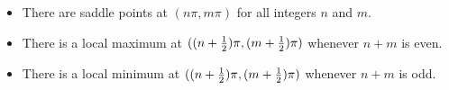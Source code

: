 \documentclass[9pt]{beamer}
\begin{document}
\begin{frame}[t]
{ }
 \fi
 \begin{itemize}
  \item<2-> There are saddle points at $(n\pi,m\pi)$ for all integers $n$ and $m$.
  \item<3-> There is a local maximum at $((n+\tfrac{1}{2})\pi,(m+\tfrac{1}{2})\pi)$ whenever $n+m$ is even.
  \item<4-> There is a local minimum at $((n+\tfrac{1}{2})\pi,(m+\tfrac{1}{2})\pi)$ whenever $n+m$ is odd.
 \end{itemize}
\end{frame}
\end{document}

